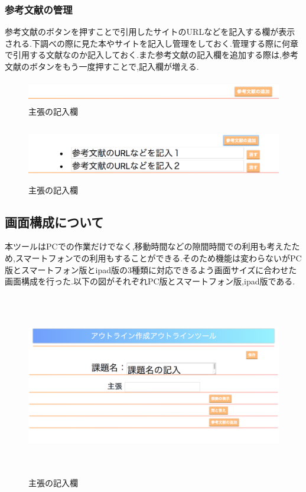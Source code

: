 \documentclass[a4j,12pt]{jarticle}
\begin{document}
\subsubsection{参考文献の管理}
参考文献のボタンを押すことで引用したサイトのURLなどを記入する欄が表示される.下調べの際に見た本やサイトを記入し管理をしておく.管理する際に何章で引用する文献なのか記入しておく.また参考文献の記入欄を追加する際は,参考文献のボタンをもう一度押すことで,記入欄が増える.

\begin{figure}[h]
\begin{center}
 \includegraphics[clip,width=150mm,height=10mm]{06sankou.png}
\end{center}
 \caption{主張の記入欄}
 \label{fig:n}
\end{figure}

\begin{figure}[h]
\begin{center}
 \includegraphics[clip,width=150mm,height=25mm]{07sankou.png}
\end{center}
 \caption{主張の記入欄}
 \label{fig:o}
\end{figure}

\newpage
\subsection{画面構成について}
本ツールはPCでの作業だけでなく,移動時間などの隙間時間での利用も考えたため,スマートフォンでの利用もすることができる.そのため機能は変わらないがPC版とスマートフォン版とipad版の3種類に対応できるよう画面サイズに合わせた画面構成を行った.以下の図がそれぞれPC版とスマートフォン版,ipad版である.
\begin{figure}[h]
\begin{center}
 \includegraphics[clip,width=150mm,height=80mm]{08gamen.png}
\end{center}
 \caption{主張の記入欄}
 \label{fig:p}
\end{figure}
\end{document}
